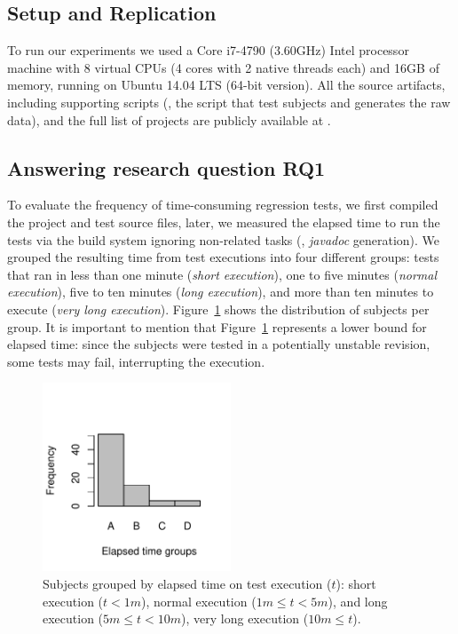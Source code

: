 \subsection{Setup and Replication}
\label{sec:setup}

To run our experiments we used a Core i7-4790 (3.60GHz) Intel
processor machine with 8 virtual CPUs (4 cores with 2 native threads
each) and 16GB of memory, running on Ubuntu 14.04 LTS (64-bit
version).  All the source
artifacts, including supporting scripts (\eg, the script that test
subjects and generates the raw data), and the full list of projects
are publicly available at .

\subsection{Answering research question RQ1}
\label{sec:rqone}


To evaluate the frequency of time-consuming regression tests, we first
compiled the project and test source files, later, we measured the
elapsed time to run the tests via the build system ignoring
non-related tasks (\eg, \emph{javadoc} generation).  We grouped the
resulting time from test executions into four different groups: tests
that ran in less than one minute (\emph{short execution}), one to five
minutes (\emph{normal execution}), five to ten minutes (\emph{long
execution}), and more than ten minutes to execute (\emph{very long
execution}).  Figure~\ref{fig:timecost-barplot} shows the distribution
of subjects per group. It is important to mention that
Figure~\ref{fig:timecost-barplot} represents a lower bound for elapsed
time: since the subjects were tested in a potentially unstable
revision, some tests may fail, interrupting the execution.

\begin{figure}[t!]
    \centering
    \includegraphics[width=0.5\textwidth]{plots/timecost-barplot/timecost-barplot.pdf}
    \caption{\label{fig:timecost-barplot} Subjects grouped by elapsed
    time on test execution ($t$): short execution ($t < 1m$), normal
    execution ($1m \leq t < 5m$), and long execution ($5m \leq t <
    10m$), very long execution ($10m \leq t$).}
\end{figure}

